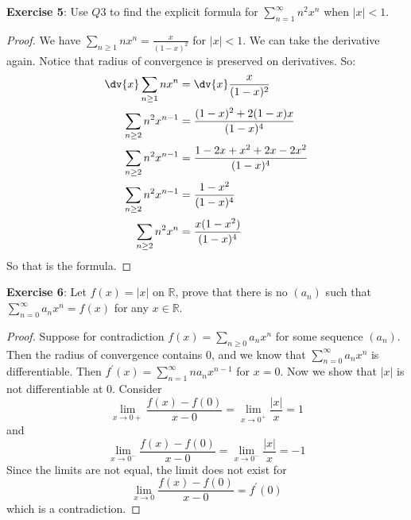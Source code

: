 \documentclass{article}
\begin{document}
\textbf{Exercise 5}: Use $Q3$ to find the explicit formula for $\sum_{n = 1}^{\infty} n^{2}x^{n}$ when $ \lvert x \rvert < 1$.
    \begin{proof}
        We have $\sum_{n \geq 1} nx^{n} = \frac{x}{(1 - x)^{2}}$ for $\lvert x \rvert < 1$. We can take the derivative again. Notice that radius of convergence is preserved on derivatives. So:
            \begin{align*}
                \dv{x}\sum_{n\geq 1}nx^{n}    &= \dv{x}\dfrac{x}{(1 - x)^{2}}                      \\
                \sum_{n \geq 2}n^{2}x^{n - 1} &= \dfrac{(1 - x)^{2} + 2(1 - x)x}{(1 - x)^{4}}      \\
                \sum_{n \geq 2}n^{2}x^{n - 1} &= \dfrac{1 - 2x + x^{2} + 2x - 2x^{2}}{(1 - x)^{4}} \\
                \sum_{n \geq 2}n^{2}x^{n - 1} &= \dfrac{1 - x^{2}}{(1 - x)^{4}}                    \\
                \sum_{n \geq 2}n^{2}x^{n}     &= \dfrac{x(1 - x^{2})}{(1 - x)^{4}}                   
            \end{align*}
        So that is the formula.
    \end{proof}

\textbf{Exercise 6}: Let $f(x) = \lvert x \rvert$ on $\mathbb{R}$, prove that there is no $(a_{n})$ such that $\sum_{n = 0}^{\infty} a_{n}x^{n} = f(x)$ for any $x \in \mathbb{R}$. 
    \begin{proof}
        Suppose for contradiction $f(x) = \sum_{n \geq 0}a_{n}x^{n}$ for some sequence $(a_{n})$. Then the radius of convergence contains $0$, and we know that $\sum_{n = 0}^{\infty} a_{n}x^{n}$ is differentiable. Then $f^{\prime}(x) = \sum_{n = 1}^{\infty} na_{n}x^{n - 1}$ for $x = 0$. Now we show that $\lvert x \rvert$ is not differentiable at $0$. Consider 
            \begin{equation*}
                \lim\limits_{x \to 0+}\dfrac{f(x) - f(0)}{x - 0} = \lim\limits_{x \to 0^{+}}\dfrac{\lvert x \rvert}{ x} = 1
            \end{equation*}
        and
            \begin{equation*}
                \lim\limits_{x \to 0^{-}}\dfrac{f(x) - f(0)}{x - 0} = \lim\limits_{x \to 0^{-}}\dfrac{\lvert x \rvert}{ x} = -1
            \end{equation*}
        Since the limits are not equal, the limit does not exist for 
            \begin{equation*}
                \lim\limits_{x \to 0}\dfrac{f(x) - f(0)}{x - 0} = f^{\prime}(0)
            \end{equation*}
        which is a contradiction.
    \end{proof}
\end{document}
